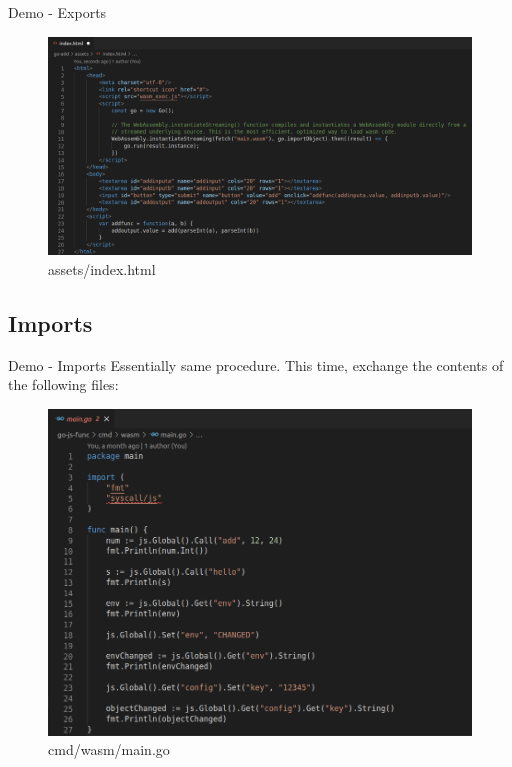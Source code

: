 \documentclass{beamer}
\begin{document}
\begin{frame}{Demo - Exports}
    \begin{figure}
        \includegraphics[scale=0.2]{./images/index.png}
        \caption{assets/index.html}
    \end{figure}

\end{frame}

\subsection{Imports}

\begin{frame}{Demo - Imports}
    Essentially same procedure. This time, exchange the contents of the following files:
    \begin{figure}
        \includegraphics[scale=0.2]{./images/importmain.png}
        \caption{cmd/wasm/main.go}
    \end{figure}

\end{frame}
\end{document}
